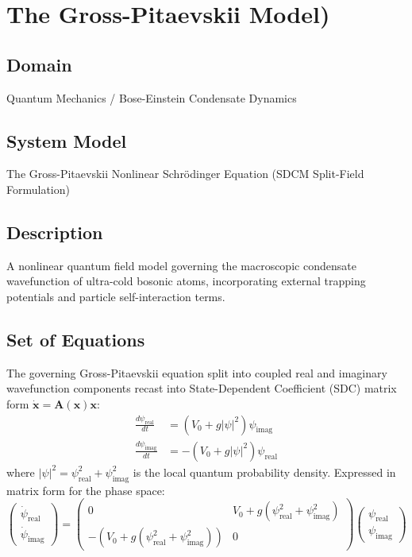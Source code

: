 \chapter{The Gross-Pitaevskii Model)}

\section{Domain}
Quantum Mechanics / Bose-Einstein Condensate Dynamics

\section{System Model}
The Gross-Pitaevskii Nonlinear Schrödinger Equation (SDCM Split-Field Formulation)

\section{Description}
A nonlinear quantum field model governing the macroscopic condensate wavefunction of ultra-cold bosonic atoms, incorporating external trapping potentials and particle self-interaction terms.

\section{Set of Equations}
The governing Gross-Pitaevskii equation split into coupled real and imaginary wavefunction components recast into State-Dependent Coefficient (SDC) matrix form $\dot{\mathbf{x}} = \mathbf{A}(\mathbf{x})\mathbf{x}$:
\begin{align}
\frac{d\psi_{\text{real}}}{dt} &= \left( V_0 + g |\psi|^2 \right) \psi_{\text{imag}} \\
\frac{d\psi_{\text{imag}}}{dt} &= -\left( V_0 + g |\psi|^2 \right) \psi_{\text{real}}
\end{align}
where $|\psi|^2 = \psi_{\text{real}}^2 + \psi_{\text{imag}}^2$ is the local quantum probability density. Expressed in matrix form for the phase space:
\begin{equation}
\begin{pmatrix} \dot{\psi}_{\text{real}} \\ \dot{\psi}_{\text{imag}} \end{pmatrix} = \begin{pmatrix} 0 & V_0 + g (\psi_{\text{real}}^2 + \psi_{\text{imag}}^2) \\ -(V_0 + g (\psi_{\text{real}}^2 + \psi_{\text{imag}}^2)) & 0 \end{pmatrix} \begin{pmatrix} \psi_{\text{real}} \\ \psi_{\text{imag}} \end{pmatrix}
\end{equation}

